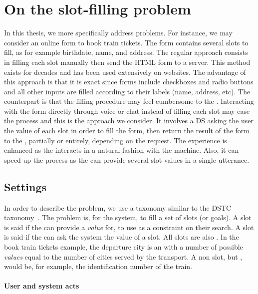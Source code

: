 \section{On the slot-filling problem}
\label{sec:slot-filling-prob}
In this thesis, we more specifically address   problems. For instance, we may consider an online form to book train tickets. The form contains several slots to fill, as for example birthdate, name, and address. The regular approach consists in filling each slot manually then send the HTML form to a server. This method exists for decades and has been used extensively on websites.
The advantage of this approach is that it is exact since forms include checkboxes and radio buttons and all other inputs are filled according to their labels (name, address, etc).
%
The counterpart is that the filling procedure may feel cumbersome to the . Interacting with the form directly through voice or chat instead of filling each slot may ease the process and this is the approach we consider. It involves a \gls{DS} asking the user the value of each slot in order to fill the form, then return the result of the form to the , partially or entirely, depending on the  request. The  experience is enhanced as the  interacts in a natural fashion with the machine. Also, it can speed up the process as the  can provide several slot values in a single utterance.

\subsection{Settings}

In order to describe the  problem, we use a taxonomy similar to the \acrfull{DSTC} taxonomy~\parencite{dstc}. The problem is, for the system, to fill a set of slots (or goals). A slot is said \informable if the  can provide a \textit{value} for, to use as a constraint on their search. A slot is said \requestable if the  can ask the system the value of a slot.  All \informable slots are also \requestable. In the book train tickets example, the departure city is an \informable with a number of possible \textit{values} equal to the number of cities served by the transport. A non \informable slot, but \requestable, would be, for example, the identification number of the train.

\paragraph{User and system acts}

